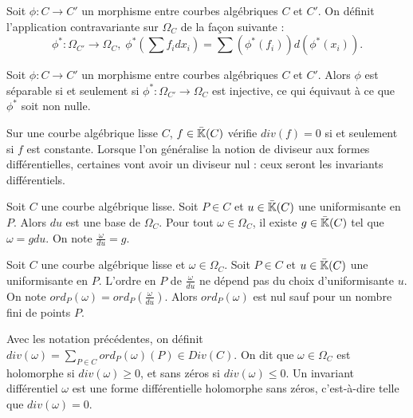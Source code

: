 \begin{Def}
	Soit $\phi : C \rightarrow C'$ un morphisme entre courbes algébriques $C$ et $C'$. On définit l'application contravariante sur $\Omega_{C}$ de la façon suivante :
	\begin{equation*}
		\phi^{*} : \Omega_{C'} \rightarrow \Omega_{C},\;\phi^{*}\left(\sum f_idx_i \right) = \sum \left( \phi^{*}(f_i) \right) d\left( \phi^{*}(x_i)\right). 
	\end{equation*}
\end{Def}

\begin{Prop}
	Soit $\phi : C \rightarrow C'$ un morphisme entre courbes algébriques $C$ et $C'$. Alors $\phi$ est séparable si et seulement si $\phi^{*} : \Omega_{C'} \rightarrow \Omega_{C}$ est injective, ce qui équivaut à ce que $\phi^{*}$ soit non nulle. 
\end{Prop}

Sur une courbe algébrique lisse $C$, $f\in\bar{\mathbb{K}}(C)$ vérifie $div(f) = 0$ si et seulement si $f$ est constante. Lorsque l'on généralise la notion de diviseur aux formes différentielles, certaines vont avoir un diviseur nul : ceux seront les invariants différentiels. 

\begin{Prop}
	Soit $C$ une courbe algébrique lisse. Soit $P\in C$ et $u\in \bar{\mathbb{K}}(C)$ une uniformisante en $P$. Alors $du$ est une base de $\Omega_{C}$. Pour tout $\omega\in\Omega_{C}$, il existe $g\in\bar{\mathbb{K}}(C)$ tel que $\omega = gdu$. On note $\frac{\omega}{du} = g$.
\end{Prop}


\begin{Prop}
	Soit $C$ une courbe algébrique lisse et $\omega\in\Omega_{C}$. Soit $P\in C$ et $u\in \bar{\mathbb{K}}(C)$ une uniformisante en $P$. L'ordre en $P$ de $\frac{\omega}{du}$ ne dépend pas du choix d'uniformisante $u$. On note $ord_{P}(\omega) = ord_{P}(\frac{\omega}{du})$. Alors $ord_{P}(\omega)$ est nul sauf pour un nombre fini de points $P$.
\end{Prop}


\begin{Def}
	Avec les notation précédentes, on définit $div(\omega) = \sum_{P\in C} ord_{P}(\omega)(P) \in Div(C)$. On dit que $\omega\in\Omega_{C}$ est holomorphe si $div(\omega)\geq 0$, et sans zéros si $div(\omega)\leq 0$. Un invariant différentiel $\omega$ est une forme différentielle holomorphe sans zéros, c'est-à-dire telle que $div(\omega) = 0$.
\end{Def}

